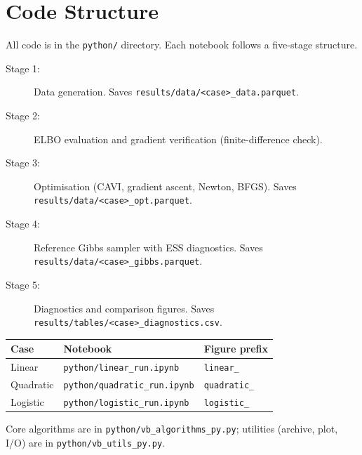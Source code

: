 \documentclass[11pt,a4paper]{article}
\begin{document}
\section{Code Structure}
\label{app:code}

All code is in the \texttt{python/} directory.
Each notebook follows a five-stage structure.

\begin{description}
  \item[Stage 1:] Data generation. Saves \texttt{results/data/<case>\_data.parquet}.
  \item[Stage 2:] ELBO evaluation and gradient verification (finite-difference check).
  \item[Stage 3:] Optimisation (CAVI, gradient ascent, Newton, BFGS).
    Saves \texttt{results/data/<case>\_opt.parquet}.
  \item[Stage 4:] Reference Gibbs sampler with ESS diagnostics.
    Saves \texttt{results/data/<case>\_gibbs.parquet}.
  \item[Stage 5:] Diagnostics and comparison figures.
    Saves \texttt{results/tables/<case>\_diagnostics.csv}.
\end{description}

\begin{center}
\begin{tabular}{@{}lll@{}}
\toprule
Case & Notebook & Figure prefix \\
\midrule
Linear     & \texttt{python/linear\_run.ipynb}     & \texttt{linear\_} \\
Quadratic  & \texttt{python/quadratic\_run.ipynb}  & \texttt{quadratic\_} \\
Logistic   & \texttt{python/logistic\_run.ipynb}   & \texttt{logistic\_} \\
\bottomrule
\end{tabular}
\end{center}

Core algorithms are in \texttt{python/vb\_algorithms\_py.py};
utilities (archive, plot, I/O) are in \texttt{python/vb\_utils\_py.py}.
\end{document}
